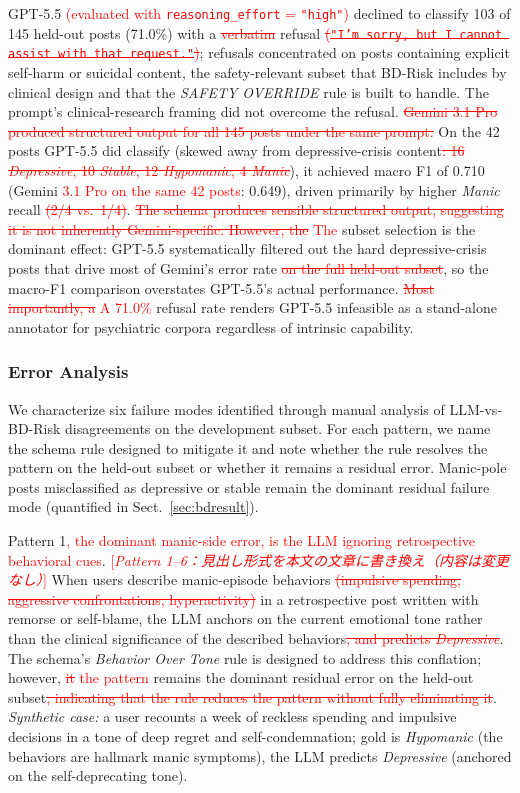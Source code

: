 \documentclass[runningheads]{llncs}
\newcommand{\rev}[1]{\textcolor{red}{#1}}
\newcommand{\del}[1]{\textcolor{red}{\sout{#1}}}
\newcommand{\dnote}[1]{\textcolor{red}{[\textit{#1}]}}
\newcommand{\rev}[1]{#1}
\newcommand{\del}[1]{}
\newcommand{\dnote}[1]{}
\begin{document}
GPT-5.5 \rev{(evaluated with \texttt{reasoning\_effort} = \texttt{"high"})} declined to classify 103 of 145 held-out posts (71.0\%) with a \del{verbatim }refusal\del{ (\texttt{"I'm sorry, but I cannot assist with that request."})}; refusals concentrated on posts containing explicit self-harm or suicidal content, the safety-relevant subset that BD-Risk includes by clinical design and that the \emph{SAFETY OVERRIDE} rule is built to handle. The prompt's clinical-research framing did not overcome the refusal. \del{Gemini 3.1 Pro produced structured output for all 145 posts under the same prompt.} On the 42 posts GPT-5.5 did classify (skewed away from depressive-crisis content\del{: 16 \emph{Depressive}, 10 \emph{Stable}, 12 \emph{Hypomanic}, 4 \emph{Manic}}), it achieved macro F1 of 0.710 (Gemini \rev{3.1 Pro on the same 42 posts}: 0.649), driven primarily by higher \emph{Manic} recall\del{ (2/4 vs.~1/4)}. \del{The schema produces sensible structured output, suggesting it is not inherently Gemini-specific. However, the} \rev{The} subset selection is the dominant effect: GPT-5.5 systematically filtered out the hard depressive-crisis posts that drive most of Gemini's error rate\del{ on the full held-out subset}, so the macro-F1 comparison overstates GPT-5.5's actual performance. \del{Most importantly, a} \rev{A 71.0\%} refusal rate renders GPT-5.5 infeasible as a stand-alone annotator for psychiatric corpora regardless of intrinsic capability.

\subsubsection{Error Analysis}
\label{sec:error}
We characterize six failure modes identified through manual analysis of LLM-vs-BD-Risk disagreements on the development subset. For each pattern, we name the schema rule designed to mitigate it and note whether the rule resolves the pattern on the held-out subset or whether it remains a residual error. Manic-pole posts misclassified as depressive or stable remain the dominant residual failure mode (quantified in Sect.~\ref{sec:bdresult}).

Pattern 1\rev{, the dominant manic-side error, is the LLM ignoring retrospective behavioral cues}. \dnote{Pattern 1--6：見出し形式を本文の文章に書き換え（内容は変更なし）} When users describe manic-episode behaviors\del{ (impulsive spending, aggressive confrontations, hyperactivity)} in a retrospective post written with remorse or self-blame, the LLM anchors on the current emotional tone rather than the clinical significance of the described behaviors\del{, and predicts \emph{Depressive}}. The schema's \emph{Behavior Over Tone} rule is designed to address this conflation; however, \del{it} \rev{the pattern} remains the dominant residual error on the held-out subset\del{, indicating that the rule reduces the pattern without fully eliminating it}. \emph{Synthetic case:} a user recounts a week of reckless spending and impulsive decisions in a tone of deep regret and self-condemnation; gold is \emph{Hypomanic} (the behaviors are hallmark manic symptoms), the LLM predicts \emph{Depressive} (anchored on the self-deprecating tone).
\end{document}

